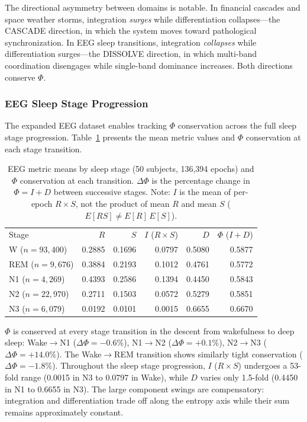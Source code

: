 \documentclass[aip,cha,reprint,amsmath,amssymb,final,floatfix]{revtex4-2}
\begin{document}
The directional asymmetry between domains is notable. In financial cascades and space weather storms, integration \emph{surges} while differentiation collapses---the CASCADE direction, in which the system moves toward pathological synchronization. In EEG sleep transitions, integration \emph{collapses} while differentiation surges---the DISSOLVE direction, in which multi-band coordination disengages while single-band dominance increases. Both directions conserve $\Phi$.

\subsubsection{EEG Sleep Stage Progression}

The expanded EEG dataset enables tracking $\Phi$ conservation across the full sleep stage progression. Table~\ref{tab:eeg_stages} presents the mean metric values and $\Phi$ conservation at each stage transition.

\begin{table}[!htbp]
\caption[EEG sleep stage means and Phi conservation across transitions]{\label{tab:eeg_stages}EEG metric means by sleep stage (50 subjects, 136,394 epochs) and $\Phi$ conservation at each transition. $\Delta\Phi$ is the percentage change in $\Phi = I + D$ between successive stages. Note: $I$ is the mean of per-epoch $R \times S$, not the product of mean $R$ and mean $S$ ($E[RS] \neq E[R]\,E[S]$).}
\begin{ruledtabular}
\begin{tabular}{lrrrrr}
Stage & $R$ & $S$ & $I$ ($R{\times}S$) & $D$ & $\Phi$ ($I{+}D$) \\
W ($n{=}93{,}400$) & 0.2885 & 0.1696 & 0.0797 & 0.5080 & 0.5877 \\
REM ($n{=}9{,}676$) & 0.3884 & 0.2193 & 0.1012 & 0.4761 & 0.5772 \\
N1 ($n{=}4{,}269$) & 0.4393 & 0.2586 & 0.1394 & 0.4450 & 0.5843 \\
N2 ($n{=}22{,}970$) & 0.2711 & 0.1503 & 0.0572 & 0.5279 & 0.5851 \\
N3 ($n{=}6{,}079$) & 0.0192 & 0.0101 & 0.0015 & 0.6655 & 0.6670 \\
\end{tabular}
\end{ruledtabular}
\end{table}

$\Phi$ is conserved at every stage transition in the descent from wakefulness to deep sleep: Wake$\to$N1 ($\Delta\Phi = -0.6\%$), N1$\to$N2 ($\Delta\Phi = +0.1\%$), N2$\to$N3 ($\Delta\Phi = +14.0\%$). The Wake$\to$REM transition shows similarly tight conservation ($\Delta\Phi = -1.8\%$). Throughout the sleep stage progression, $I$ ($R \times S$) undergoes a 53-fold range (0.0015 in N3 to 0.0797 in Wake), while $D$ varies only 1.5-fold (0.4450 in N1 to 0.6655 in N3). The large component swings are compensatory: integration and differentiation trade off along the entropy axis while their sum remains approximately constant.
\end{document}
